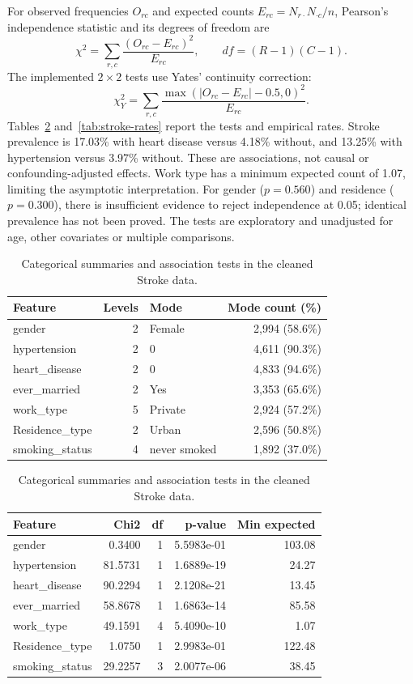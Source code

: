 \documentclass[12pt, a4paper]{article}
\begin{document}
For observed frequencies $O_{rc}$ and expected counts $E_{rc}=N_{r\cdot}N_{\cdot c}/n$, Pearson's independence statistic and its degrees of freedom are
\[
\chi^2=\sum_{r,c}\frac{(O_{rc}-E_{rc})^2}{E_{rc}},\qquad df=(R-1)(C-1).
\]
The implemented $2\times2$ tests use Yates' continuity correction:
\[
\chi_Y^2=\sum_{r,c}\frac{\max(|O_{rc}-E_{rc}|-0.5,0)^2}{E_{rc}}.
\]
Tables~\ref{tab:stroke-categories} and~\ref{tab:stroke-rates} report the tests and empirical rates. Stroke prevalence is 17.03\% with heart disease versus 4.18\% without, and 13.25\% with hypertension versus 3.97\% without. These are associations, not causal or confounding-adjusted effects. Work type has a minimum expected count of 1.07, limiting the asymptotic interpretation. For gender ($p=0.560$) and residence ($p=0.300$), there is insufficient evidence to reject independence at 0.05; identical prevalence has not been proved. The tests are exploratory and unadjusted for age, other covariates or multiple comparisons.
\begin{table}[htbp]
\centering\small
\setlength{\tabcolsep}{4pt}\renewcommand{\arraystretch}{1.12}
\caption{Categorical summaries and association tests in the cleaned Stroke data.}
\label{tab:stroke-categories}
\begin{tabular}{p{.27\linewidth}rp{.24\linewidth}r}
\toprule
\raggedright \textbf{Feature} & \textbf{Levels} & \raggedright \textbf{Mode} & \textbf{Mode count (\%)} \tabularnewline
\midrule
\raggedright gender & 2 & \raggedright Female & 2,994 (58.6\%) \tabularnewline
\raggedright hypertension & 2 & \raggedright 0 & 4,611 (90.3\%) \tabularnewline
\raggedright heart\_disease & 2 & \raggedright 0 & 4,833 (94.6\%) \tabularnewline
\raggedright ever\_married & 2 & \raggedright Yes & 3,353 (65.6\%) \tabularnewline
\raggedright work\_type & 5 & \raggedright Private & 2,924 (57.2\%) \tabularnewline
\raggedright Residence\_type & 2 & \raggedright Urban & 2,596 (50.8\%) \tabularnewline
\raggedright smoking\_status & 4 & \raggedright never smoked & 1,892 (37.0\%) \tabularnewline
\bottomrule
\end{tabular}
\par\medskip
\begin{tabular}{lrrrr}
\toprule
\textbf{Feature} & \textbf{Chi2} & \textbf{df} & \textbf{p-value} & \textbf{Min expected} \tabularnewline
\midrule
gender & 0.3400 & 1 & 5.5983e-01 & 103.08 \tabularnewline
hypertension & 81.5731 & 1 & 1.6889e-19 & 24.27 \tabularnewline
heart\_disease & 90.2294 & 1 & 2.1208e-21 & 13.45 \tabularnewline
ever\_married & 58.8678 & 1 & 1.6863e-14 & 85.58 \tabularnewline
work\_type & 49.1591 & 4 & 5.4090e-10 & 1.07 \tabularnewline
Residence\_type & 1.0750 & 1 & 2.9983e-01 & 122.48 \tabularnewline
smoking\_status & 29.2257 & 3 & 2.0077e-06 & 38.45 \tabularnewline
\bottomrule
\end{tabular}
\par{}
\end{table}
\end{document}
